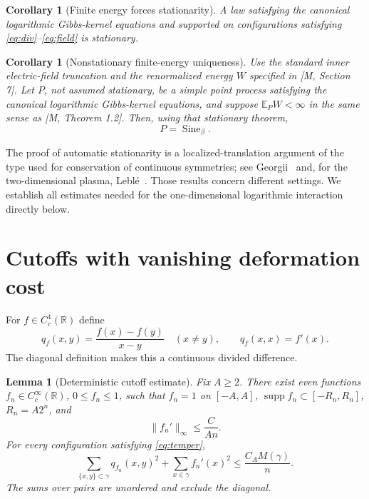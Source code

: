\documentclass[11pt,reqno]{amsart}
\numberwithin{equation}{section}
\newtheorem{lemma}[theorem]{Lemma}
\newtheorem{corollary}[theorem]{Corollary}
\theoremstyle{definition}
\theoremstyle{remark}
\newcommand{\R}{\mathbb R}
\newcommand{\E}{\mathbb E}
\newcommand{\1}{\mathbf1}
\newcommand{\Sine}{\operatorname{Sine}}
\DeclareMathOperator{\supp}{supp}
\begin{document}
\begin{corollary}[Finite energy forces stationarity]\label{cor:energy-stationarity}
A law satisfying the canonical logarithmic Gibbs-kernel equations and
supported on configurations satisfying \eqref{eq:div}--\eqref{eq:field}
is stationary.
\end{corollary}

\begin{corollary}[Nonstationary finite-energy uniqueness]\label{cor:uniqueness}
Use the standard inner electric-field truncation and the renormalized
energy $W$ specified in [M, Section 7]. Let $P$, not assumed stationary,
be a simple point process satisfying the canonical logarithmic
Gibbs-kernel equations, and suppose $\E_P W<\infty$ in the same sense as
[M, Theorem 1.2]. Then, using that stationary theorem,
\[
P=\Sine_\beta.
\]
\end{corollary}

The proof of automatic stationarity is a localized-translation argument
of the type used for conservation of continuous symmetries; see
Georgii~\cite{Geo} and, for the two-dimensional plasma,
Lebl\'e~\cite[Section 8]{Leble}. Those results concern different settings.
We establish all estimates needed for the one-dimensional logarithmic
interaction directly below.

\section{Cutoffs with vanishing deformation cost}

For $f\in C_c^1(\R)$ define
\[
q_f(x,y)=\frac{f(x)-f(y)}{x-y}\quad(x\ne y),
\qquad q_f(x,x)=f'(x).
\]
The diagonal definition makes this a continuous divided difference.

\begin{lemma}[Deterministic cutoff estimate]\label{lem:cutoff}
Fix $A\ge2$. There exist even functions $f_n\in C_c^\infty(\R)$,
$0\le f_n\le1$, such that $f_n=1$ on $[-A,A]$,
$\supp f_n\subset[-R_n,R_n]$, $R_n=A2^n$, and
\begin{equation}\label{eq:lip}
\|f_n'\|_\infty\le\frac{C}{An}.
\end{equation}
For every configuration satisfying \eqref{eq:temper},
\begin{equation}\label{eq:cost}
\sum_{\{x,y\}\subset\gamma}q_{f_n}(x,y)^2
+\sum_{x\in\gamma}f_n'(x)^2
\le\frac{C_A M(\gamma)}{n}.
\end{equation}
The sums over pairs are unordered and exclude the diagonal.
\end{lemma}
\end{document}
